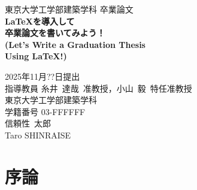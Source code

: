 \documentclass[11pt,a4j,onecolumn]{jsreport} %
\begin{document}

\begin{titlepage}
\centering

\vspace{20truemm}
{\Large\noindent 東京大学工学部建築学科 卒業論文}\\
\vspace{40truemm}
{\huge\noindent\textbf{\LaTeX を導入して}}\\
\medskip
{\huge\noindent\textbf{卒業論文を書いてみよう！}}\\
\vspace{\baselineskip}
{\large\noindent\textbf{(Let's Write a Graduation Thesis}}\\
\medskip
{\large\noindent\textbf{Using \LaTeX !)}}\\
\vspace{48truemm}

{\Large\noindent
  2025年11月??日提出\\
  \vspace{8truemm}
  指導教員 糸井~達哉~准教授，小山~毅~特任准教授}\\
\vspace{16truemm}
{\large\noindent
  東京大学工学部建築学科 \\
  \vspace{4truemm}
  学籍番号 03-FFFFFF\\
  \vspace{6truemm}
  信頼性~太郎\\
  \vspace{2truemm}
  Taro SHINRAISE \\
}

\end{titlepage}

\thispagestyle{empty}
\clearpage


\tableofcontents      %


\newpage
\pagestyle{fancy}
\setcounter{page}{1}  %



\chapter{序論}
\end{document}
